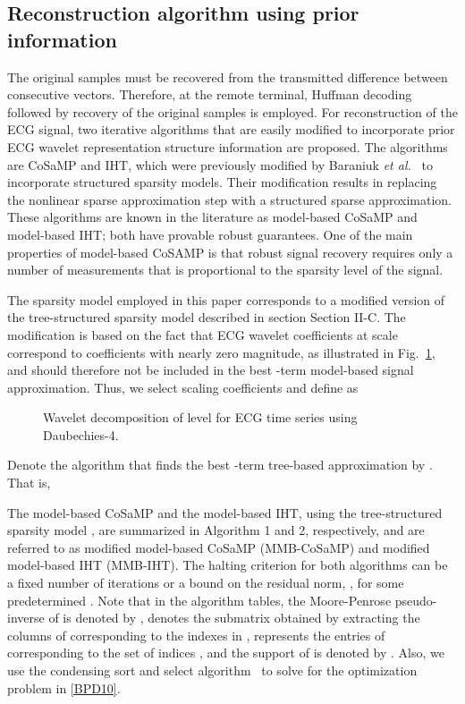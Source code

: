 \documentclass[journal]{IEEEtran}
\begin{document}
\subsection{Reconstruction algorithm using prior information}
The original samples must be recovered from the transmitted difference between consecutive vectors. Therefore, at the remote terminal, Huffman decoding followed by recovery of the original samples is employed. For reconstruction of the ECG signal, two iterative algorithms that are easily modified to incorporate prior ECG wavelet representation structure information are proposed. The algorithms are CoSaMP and IHT, which were previously modified by Baraniuk \textit{et al.}~\cite{Bara10} to incorporate structured sparsity models. Their modification results in replacing the nonlinear sparse approximation step with a structured sparse approximation. These algorithms are known in the literature as model-based CoSaMP and model-based IHT; both have provable robust guarantees. One of the main properties of model-based CoSAMP is that robust signal recovery requires only a number of measurements that is proportional to the sparsity level of the signal.

The sparsity model employed in this paper corresponds to a modified version of the tree-structured sparsity model described in section Section II-C. The modification is based on the fact that ECG wavelet coefficients at scale  correspond to coefficients with nearly zero magnitude, as illustrated in Fig.~\ref{fig:4}, and should  therefore not be included in the best -term model-based signal approximation. Thus, we select  scaling coefficients and define  as


\begin{figure}[t]
\caption{Wavelet decomposition of level  for ECG time series using Daubechies-4.} \label{fig:4}
\end{figure}
Denote the algorithm that finds the best -term tree-based approximation by . That is,

The model-based CoSaMP and the model-based IHT, using the tree-structured sparsity model , are summarized in Algorithm 1 and 2, respectively, and are referred to as modified model-based CoSaMP (MMB-CoSaMP) and modified model-based IHT (MMB-IHT). The halting criterion for both algorithms can be a fixed number of iterations or a bound on the residual norm, , for some predetermined . Note that in the algorithm tables, the Moore-Penrose pseudo-inverse of  is denoted by ,  denotes the submatrix obtained by extracting the columns of  corresponding to the indexes in ,  represents the entries of  corresponding to the set of indices , and the support of  is denoted by . Also, we use the condensing sort and select algorithm~\cite{Bara02} to solve for the optimization problem in \eqref{BPD10}.
\end{document}
